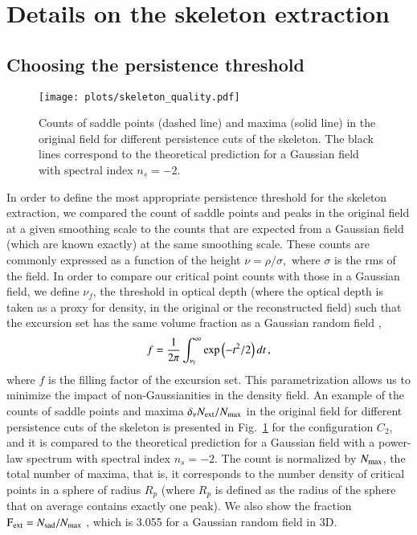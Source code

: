 \documentclass{aa}
\begin{document}
{{{{{{{{{{{{{{\section{Details on the skeleton extraction}
\label{App:SkelExt}

\renewcommand{\thefigure}{B.\arabic{figure}}
\setcounter{figure}{0}

\subsection{Choosing the persistence threshold}
\begin{figure}
\begin{center}
\texttt{[image: plots/skeleton\_quality.pdf]}
\caption{Counts of saddle points (dashed line) and maxima (solid line) in the original field for different persistence cuts of the skeleton. The black lines correspond to the theoretical prediction for a Gaussian field with spectral index $n_s=-2$.}
\label{figC0}
\end{center}
\end{figure}
In order to define the most appropriate persistence threshold for the skeleton extraction, we compared the count of saddle points  and peaks in the original field at a given smoothing scale to the counts that are expected from a Gaussian field (which are known exactly) at the same smoothing scale. These counts are commonly expressed as a function of the height $\nu=\rho/\sigma,$ where $\sigma$ is the rms of the field. In order to compare our critical point counts with those in a Gaussian field, we define  $\nu_{f}$, the  threshold in optical depth (where the optical depth is taken as a proxy for density, in the original or the reconstructed field) such that the excursion set has the same volume fraction as a Gaussian random field \citep[e.g.][]{Gott1987,Weinberg1987,Melott1988,Appleby18},
\begin{equation}
f=\dfrac{1}{2\pi}\int_{\nu_{\rm f}}^{\infty} \exp\left(-t^2/2\right) dt\,,\end{equation}
where $f$ is the filling factor of the excursion set. This parametrization allows us to minimize the impact of non-Gaussianities in the density field. An example of the counts of saddle points and maxima $\delta_{\nu} {N_{\rm ext}}/{N_{\rm max}}$ in the original field for different persistence cuts of the skeleton is presented in Fig.~\ref{figC0} for the configuration $C_2$, and it is compared to the theoretical prediction for a Gaussian field with a power-law spectrum with spectral index $n_s=-2$. The count is normalized by $N_{\rm max}$, the total number of maxima, that is, it corresponds to the number density of critical points in a sphere of radius $R_{p}$ (where $R_{p}$ is defined as the radius of the sphere that on average contains exactly one peak). We also show the fraction ${\rm F}_{\rm ext}=N_{\rm sad}/N_{\rm max}$ , which is 3.055 for a Gaussian random field in 3D. 
}}}}}}}}}}}}}}
\end{document}
